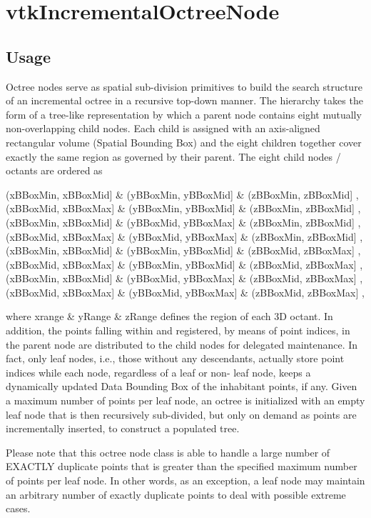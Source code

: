 \section{vtkIncrementalOctreeNode}

\subsection{Usage}

  Octree nodes serve as spatial sub-division primitives to build the search
  structure of an incremental octree in a recursive top-down manner. The
  hierarchy takes the form of a tree-like representation by which a parent
  node contains eight mutually non-overlapping child nodes. Each child is 
  assigned with an axis-aligned rectangular volume (Spatial Bounding Box) 
  and the eight children together cover exactly the same region as governed
  by their parent. The eight child nodes / octants are ordered as

  { (xBBoxMin, xBBoxMid] \& (yBBoxMin, yBBoxMid] \& (zBBoxMin, zBBoxMid] },
  { (xBBoxMid, xBBoxMax] \& (yBBoxMin, yBBoxMid] \& (zBBoxMin, zBBoxMid] },
  { (xBBoxMin, xBBoxMid] \& (yBBoxMid, yBBoxMax] \& (zBBoxMin, zBBoxMid] }, 
  { (xBBoxMid, xBBoxMax] \& (yBBoxMid, yBBoxMax] \& (zBBoxMin, zBBoxMid] },
  { (xBBoxMin, xBBoxMid] \& (yBBoxMin, yBBoxMid] \& (zBBoxMid, zBBoxMax] },
  { (xBBoxMid, xBBoxMax] \& (yBBoxMin, yBBoxMid] \& (zBBoxMid, zBBoxMax] },
  { (xBBoxMin, xBBoxMid] \& (yBBoxMid, yBBoxMax] \& (zBBoxMid, zBBoxMax] }, 
  { (xBBoxMid, xBBoxMax] \& (yBBoxMid, yBBoxMax] \& (zBBoxMid, zBBoxMax] },

  where { xrange \& yRange \& zRange } defines the region of each 3D octant. 
  In addition, the points falling within and registered, by means of point
  indices, in the parent node are distributed to the child nodes for delegated
  maintenance. In fact, only leaf nodes, i.e., those without any descendants,
  actually store point indices while each node, regardless of a leaf or non-
  leaf node, keeps a dynamically updated Data Bounding Box of the inhabitant 
  points, if any. Given a maximum number of points per leaf node, an octree 
  is initialized with an empty leaf node that is then recursively sub-divided, 
  but only on demand as points are incrementally inserted, to construct a 
  populated tree.

  Please note that this octree node class is able to handle a large number
  of EXACTLY duplicate points that is greater than the specified maximum
  number of points per leaf node. In other words, as an exception, a leaf
  node may maintain an arbitrary number of exactly duplicate points to deal
  with possible extreme cases.
 

